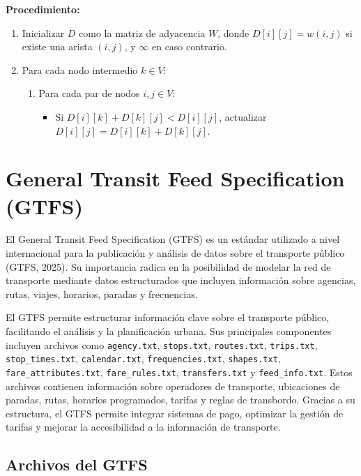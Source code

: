\documentclass[11pt]{article}
\begin{document}
			\textbf{Procedimiento:}
			\begin{enumerate}
				\item Inicializar $D$ como la matriz de adyacencia $W$, donde $D[i][j] = w(i,j)$ si existe una arista $(i,j)$, y $\infty$ en caso contrario.
				\item Para cada nodo intermedio $k \in V$:
				\begin{enumerate}
					\item Para cada par de nodos $i, j \in V$:
					\begin{itemize}
						\item Si $D[i][k] + D[k][j] < D[i][j]$, actualizar $D[i][j] = D[i][k] + D[k][j]$.
					\end{itemize}
				\end{enumerate}
			\end{enumerate}

    \section{General Transit Feed Specification (GTFS)}

		El General Transit Feed Specification (GTFS) es un estándar utilizado a nivel internacional para la publicación y análisis de datos sobre el transporte público (GTFS, 2025). Su importancia radica en la posibilidad de modelar la red de transporte mediante datos estructurados que incluyen información sobre agencias, rutas, viajes, horarios, paradas y frecuencias.

		El GTFS permite estructurar información clave sobre el transporte público, facilitando el análisis y la planificación urbana. Sus principales componentes incluyen archivos como \texttt{agency.txt}, \texttt{stops.txt}, \texttt{routes.txt}, \texttt{trips.txt}, \texttt{stop\_times.txt}, \texttt{calendar.txt}, \texttt{frequencies.txt}, \texttt{shapes.txt}, \texttt{fare\_attributes.txt}, \texttt{fare\_rules.txt}, \texttt{transfers.txt} y \texttt{feed\_info.txt}. Estos archivos contienen información sobre operadores de transporte, ubicaciones de paradas, rutas, horarios programados, tarifas y reglas de transbordo. Gracias a su estructura, el GTFS permite integrar sistemas de pago, optimizar la gestión de tarifas y mejorar la accesibilidad a la información de transporte.

		\subsection{Archivos del GTFS}
\end{document}
